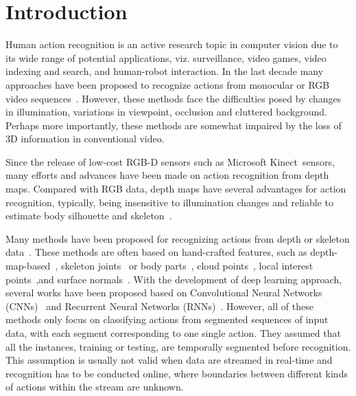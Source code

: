 \documentclass[sigconf]{acmart}
\begin{document}





\maketitle

\section{Introduction}

Human action recognition is an active research topic in computer vision due to its wide range of potential applications, viz. surveillance, video games, video indexing and search, and human-robot interaction. In the last decade many approaches have been proposed to recognize actions from monocular or RGB video sequences~\cite{aggarwal2011human}. However, these methods face the difficulties posed by changes in illumination, variations in viewpoint, occlusion and cluttered background. Perhaps more importantly, these methods are somewhat impaired by the loss of 3D information in conventional video.

Since the release of low-cost RGB-D sensors such as Microsoft Kinect~\texttrademark sensors, many efforts and advances have been made on action recognition from depth maps. Compared with RGB data, depth maps have several advantages for action recognition, typically, being insensitive to illumination changes and reliable to estimate body silhouette and skeleton~\cite{shotton2013real}.


Many methods have been proposed for recognizing actions from depth or skeleton data~\cite{aggarwal2014human,li2010action}. These methods are often based on hand-crafted features, such as depth-map-based~\cite{yang2012recognizing}, skeleton joints~\cite{vemulapalli2014human,zanfir2013moving} or body parts~\cite{shotton2013real}, cloud points~\cite{wang2012robust,rahmani2014hopc}, local interest points~\cite{xia2013spatio},and surface normals~\cite{oreifej2013hon4d,yang2014super}. With the development of deep learning approach, several works have been proposed based on Convolutional Neural Networks (CNNs)~\cite{wang2015convnets,wang2016mm,wang2016action} and Recurrent Neural Networks (RNNs)~\cite{donahue2015long,du2015hierarchical,shahroudy2016ntu}. However, all of these methods only focus on classifying actions from segmented sequences of input data, with each segment corresponding to one single action. They assumed that all the instances, training or testing, are temporally segmented before recognition. This assumption is usually not valid when data are streamed in real-time and recognition has to be conducted online, where boundaries between different kinds of actions within the stream are unknown.
\end{document}
